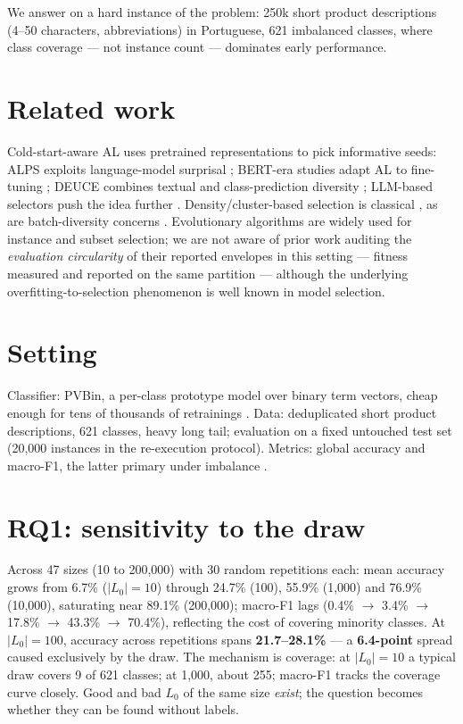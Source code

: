 \documentclass[11pt]{article}
\begin{document}
We answer on a hard instance of the problem: 250k short product
descriptions (4--50 characters, abbreviations) in Portuguese, 621
imbalanced classes, where class coverage --- not instance count ---
dominates early performance.

\section{Related work}
\label{sec:related}

Cold-start-aware AL uses pretrained representations to pick informative
seeds: ALPS exploits language-model surprisal \citep{Yuan2020}; BERT-era
studies adapt AL to fine-tuning \citep{EinDor2020,Griesshaber2020}; DEUCE
combines textual and class-prediction diversity \citep{Guo2025Deuce};
LLM-based selectors push the idea further \citep{Bayer2024}.
Density/cluster-based selection is classical
\citep{Settles2008,Nguyen2004,Dasgupta2008}, as are batch-diversity
concerns \citep{Hoi2006}. Evolutionary algorithms
\citep{Holland1975,Goldberg1989} are widely used for instance and subset
selection; we are not aware of prior work auditing the \emph{evaluation
circularity} of their reported envelopes in this setting --- fitness
measured and reported on the same partition --- although the underlying
overfitting-to-selection phenomenon is well known in model selection.

\section{Setting}
\label{sec:setting}

Classifier: PVBin, a per-class prototype model over binary term vectors,
cheap enough for tens of thousands of retrainings
\citep{Daru2024Dissertacao}. Data: deduplicated short product
descriptions, 621 classes, heavy long tail; evaluation on a fixed
untouched test set (20{,}000 instances in the re-execution protocol).
Metrics: global accuracy and macro-F1, the latter primary under
imbalance \citep{Sokolova2009}.

\section{RQ1: sensitivity to the draw}
\label{sec:sens}

Across 47 sizes (10 to 200{,}000) with 30 random repetitions each:
mean accuracy grows from 6.7\% ($|L_0|=10$) through 24.7\% (100), 55.9\%
(1{,}000) and 76.9\% (10{,}000), saturating near 89.1\% (200{,}000);
macro-F1 lags (0.4\% $\to$ 3.4\% $\to$ 17.8\% $\to$ 43.3\% $\to$ 70.4\%),
reflecting the cost of covering minority classes. At $|L_0|=100$,
accuracy across repetitions spans \textbf{21.7--28.1\%} --- a
\textbf{6.4-point} spread caused exclusively by the draw. The mechanism
is coverage: at $|L_0|=10$ a typical draw covers 9 of 621 classes; at
1{,}000, about 255; macro-F1 tracks the coverage curve closely. Good and
bad $L_0$ of the same size \emph{exist}; the question becomes whether
they can be found without labels.
\end{document}
